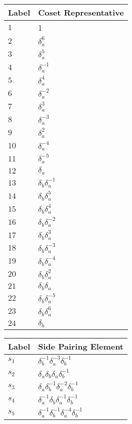 \documentclass{article}
\begin{document}

\begin{center}
\begin{tabular}{ll}
\toprule
Label & Coset Representative\\
\midrule
$1$ & 1 \\
$2$ & $\delta_a^{6}$ \\
$3$ & $\delta_a^{5}$ \\
$4$ & $\delta_a^{-1}$ \\
$5$ & $\delta_a^{4}$ \\
$6$ & $\delta_a^{-2}$ \\
$7$ & $\delta_a^{3}$ \\
$8$ & $\delta_a^{-3}$ \\
$9$ & $\delta_a^{2}$ \\
$10$ & $\delta_a^{-4}$ \\
$11$ & $\delta_a^{-5}$ \\
$12$ & $\delta_a^{}$ \\
$13$ & $\delta_b^{}\delta_a^{-1}$ \\
$14$ & $\delta_b^{}\delta_a^{5}$ \\
$15$ & $\delta_b^{}\delta_a^{4}$ \\
$16$ & $\delta_b^{}\delta_a^{-2}$ \\
$17$ & $\delta_b^{}\delta_a^{3}$ \\
$18$ & $\delta_b^{}\delta_a^{-3}$ \\
$19$ & $\delta_b^{}\delta_a^{-4}$ \\
$20$ & $\delta_b^{}\delta_a^{2}$ \\
$21$ & $\delta_b^{}\delta_a^{}$ \\
$22$ & $\delta_b^{}\delta_a^{-5}$ \\
$23$ & $\delta_b^{}\delta_a^{6}$ \\
$24$ & $\delta_b^{}$ \\
\bottomrule
\end{tabular}
\hfill
\begin{tabular}{ll}
\toprule
Label & Side Pairing Element\\
\midrule
$s_{1}$ & $\delta_b^{-1}\delta_a^{-3}\delta_b^{-1}$ \\
$s_{2}$ & $\delta_a^{}\delta_b^{}\delta_a^{}\delta_b^{-1}$ \\
$s_{3}$ & $\delta_a^{}\delta_b^{-1}\delta_a^{-2}\delta_b^{-1}$ \\
$s_{4}$ & $\delta_a^{-1}\delta_b^{}\delta_a^{-1}\delta_b^{-1}$ \\
$s_{5}$ & $\delta_a^{-1}\delta_b^{-1}\delta_a^{-4}\delta_b^{-1}$ \\

\end{tabular}
\end{center}
\end{document}
